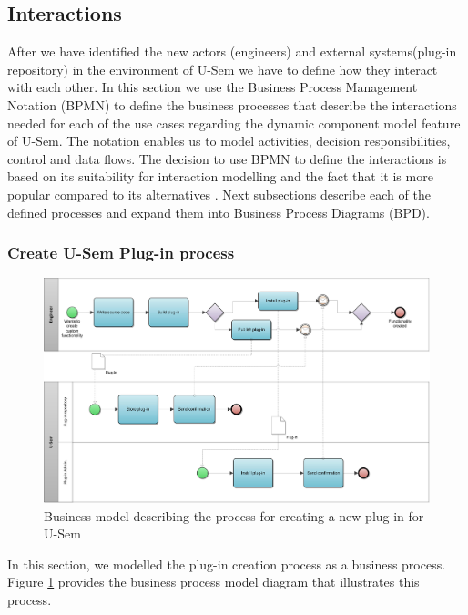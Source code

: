 \subsection{Interactions}

After we have identified the new actors (engineers) and external systems(plug-in repository) in the environment of U-Sem we have to define how they interact with each other. In this section we use the Business Process Management Notation (BPMN) \cite{wohed2006suitability} to define the business processes that describe the interactions needed for each of the use cases regarding the dynamic component model feature of U-Sem. The notation enables us to model activities, decision responsibilities, control and data flows. The decision to use BPMN to define the interactions is based on its suitability for interaction modelling and the fact that it is more popular compared to its alternatives \cite{decker2008interaction}. Next subsections describe each of the defined processes and expand them into Business Process Diagrams (BPD).

\subsubsection{Create U-Sem Plug-in process}

\begin{figure}[h!]
  \centering
  	\includegraphics[scale=0.75,angle=270]{plug-in/business_processes/CreatePlugInBusinessModel.jpg}
  \caption{Business model describing the process for creating a new plug-in for U-Sem}
  \label{fig_install_bpm}
\end{figure}

In this section, we modelled the plug-in creation process as a business process. Figure \ref{fig_install_bpm} provides the business process model diagram that illustrates this process. 

